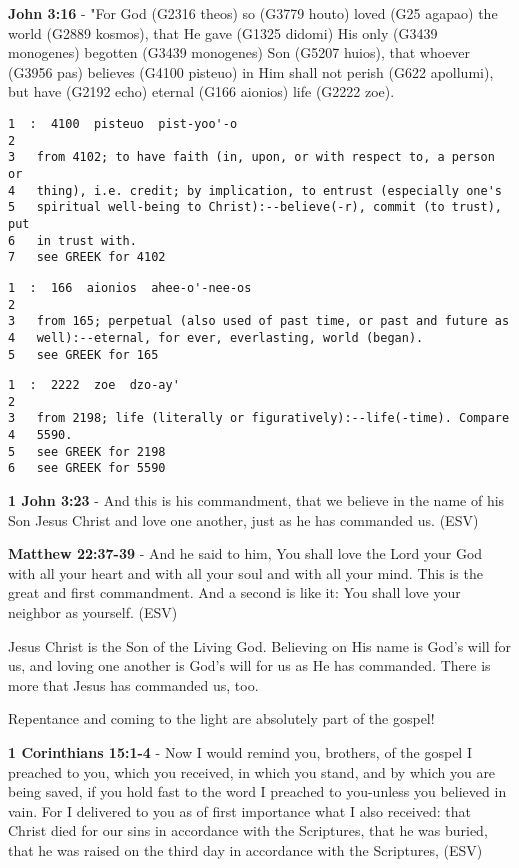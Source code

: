 \documentclass[11pt]{article}
\begin{document}
\textbf{John 3:16} - "For God (G2316 theos) so (G3779 houto) loved (G25 agapao) the world (G2889 kosmos), that He gave (G1325 didomi) His only (G3439 monogenes) begotten (G3439 monogenes) Son (G5207 huios), that whoever (G3956 pas) believes (G4100 pisteuo) in Him shall not perish (G622 apollumi), but have (G2192 echo) eternal (G166 aionios) life (G2222 zoe).

\begin{verbatim}
1  :  4100  pisteuo  pist-yoo'-o
2  
3   from 4102; to have faith (in, upon, or with respect to, a person or
4   thing), i.e. credit; by implication, to entrust (especially one's
5   spiritual well-being to Christ):--believe(-r), commit (to trust), put
6   in trust with.
7   see GREEK for 4102
\end{verbatim}

\begin{verbatim}
1  :  166  aionios  ahee-o'-nee-os
2  
3   from 165; perpetual (also used of past time, or past and future as
4   well):--eternal, for ever, everlasting, world (began).
5   see GREEK for 165
\end{verbatim}

\begin{verbatim}
1  :  2222  zoe  dzo-ay'
2  
3   from 2198; life (literally or figuratively):--life(-time). Compare
4   5590.
5   see GREEK for 2198
6   see GREEK for 5590
\end{verbatim}

\textbf{1 John 3:23} - And this is his commandment, that we believe in the name of his Son Jesus Christ and love one another, just as he has commanded us. (ESV)

\textbf{Matthew 22:37-39} - And he said to him, You shall love the Lord your God with all your heart and with all your soul and with all your mind. This is the great and first commandment. And a second is like it: You shall love your neighbor as yourself. (ESV)

Jesus Christ is the Son of the Living God. Believing on His name is God's will for us, and loving one another is God's will for us as He has commanded. There is more that Jesus has commanded us, too.

Repentance and coming to the light are absolutely part of the gospel!

\textbf{1 Corinthians 15:1-4} -  Now I would remind you, brothers, of the gospel I preached to you, which you received, in which you stand, and by which you are being saved, if you hold fast to the word I preached to you-unless you believed in vain.  For I delivered to you as of first importance what I also received: that Christ died for our sins in accordance with the Scriptures, that he was buried, that he was raised on the third day in accordance with the Scriptures,  (ESV)
\end{document}
